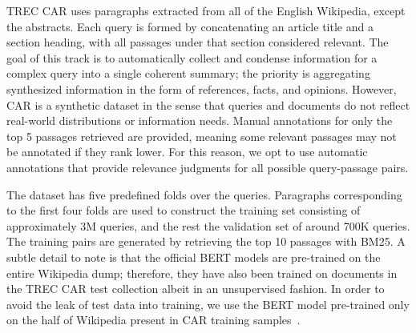 
TREC CAR \cite{dietz2017trec} uses paragraphs extracted from all of the English Wikipedia, except the abstracts.
Each query is formed by concatenating an article title and a section heading, with all passages under that section considered relevant.
The goal of this track is to automatically collect and condense information for a complex query into a single coherent summary; the priority is aggregating synthesized information in the form of references, facts, and opinions.
However, CAR is a synthetic dataset in the sense that queries and documents do not reflect real-world distributions or information needs.
Manual annotations for only the top 5 passages retrieved are provided, meaning some relevant passages may not be annotated if they rank lower.
For this reason, we opt to use automatic annotations that provide relevance judgments for all possible query-passage pairs.

The dataset has five predefined folds over the queries.
Paragraphs corresponding to the first four folds are used to construct the training set consisting of approximately 3M queries, and the rest the validation set of around 700K queries.
The training pairs are generated by retrieving the top 10 passages with BM25.
A subtle detail to note is that the official BERT models are pre-trained on the entire Wikipedia dump; therefore, they have also been trained on documents in the TREC CAR test collection albeit in an unsupervised fashion.
In order to avoid the leak of test data into training, we use the BERT model pre-trained only on the half of Wikipedia present in CAR training samples~\cite{nogueira2019passage}.

